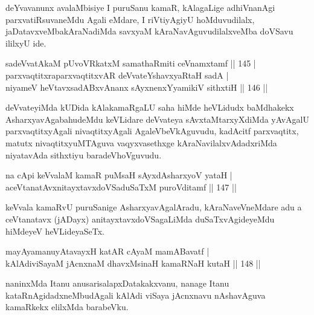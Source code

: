 \begin{artha}
deYvavanunx avalaMbisiye I puruSanu kamaR, kAlagaLige adhiVnanAgi  parxvatiRsuvaneMdu Agali eMdare, I riVtiyAgiyU hoMduvudilalx, jaDatavxveMbakAraNadiMda savxyaM kAraNavAguvudilalxveMba doVSavu ililxyU ide.
\end{artha}


\begin{shl}
sadeVvatAkaM pUvoVRkatxM samathaRmiti ceVnamxtamf \hfill || 145 |\\
parxvaqtitxraparxvaqtitxvAR deVvateYshavxyaRtaH sadA |\\
niyameV heVtavxsadABxvAnanx sAyxnenxYyamikiV sithxtiH \hfill || 146 ||
\end{shl}

\begin{artha}
deVvateyiMda kUDida kAlakamaRgaLU saha hiMde heVLidudx baMdhakekx AsharxyavAgabahudeMdu keVLidare deVvateya sAvxtaMtarxyXdiMda yAvAgalU parxvaqtitxyAgali nivaqtitxyAgali AgaleVbeVkAguvudu, kadAcitf parxvaqtitx, matutx nivaqtitx\-yuMTAguva vaqyxvasethxge kAraNavilalxvAdadxriMda niyatavAda sithxtiyu baradeVhoVguvudu.
\end{artha}


\begin{shl}
na cApi keVvalaM kamaR puMsaH sAyxdAsharxyoV yataH |\\
aceVtanatAvxnitayxtavxdoVSaduSaTxM puroVditamf \hfill || 147 ||
\end{shl}

\begin{artha}
keVvala kamaRvU puruSanige AsharxyavAgalAradu, kAraNaveVneMdare adu a ceVtanatavx (jADayx) anitayxtavxdoVSagaLiMda duSaTxvAgideyeMdu hiMdeyeV heVLideyaSeTx.
\end{artha}

\begin{shl}
mayA\s yamanuyAtavayxH katAR cAyaM mamABavatf |\\
kAlAdiviSayaM jAcnxnaM dhavxMsinaH kamaRNaH kutaH \hfill || 148 ||
\end{shl}

\begin{artha}
naninxMda Itanu anusarisalapxDatakakxvanu, nanage Itanu kataRnAgidadxneMbudAgali kAlAdi viSaya jAcnxnavu nAshavAguva kamaRkekx elilxMda barabeVku.
\end{artha}

